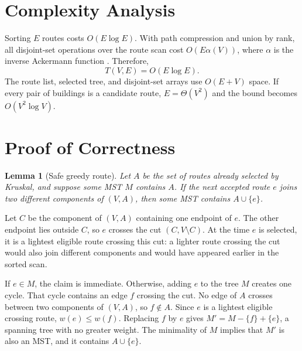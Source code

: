 \documentclass[conference]{IEEEtran}
\newtheorem{lemma}{Lemma}
\begin{document}
\section{Complexity Analysis}

Sorting $E$ routes costs $O(E\log E)$. With path compression and union by
rank, all disjoint-set operations over the route scan cost
$O(E\alpha(V))$, where $\alpha$ is the inverse Ackermann function
\cite{cormen2009introduction}. Therefore,
\begin{equation}
  T(V,E)=O(E\log E).
\end{equation}
The route list, selected tree, and disjoint-set arrays use $O(E+V)$ space. If
every pair of buildings is a candidate route, $E=\Theta(V^2)$ and the bound
becomes $O(V^2\log V)$.

\section{Proof of Correctness}

\begin{lemma}[Safe greedy route]\label{lem:safe}
Let $A$ be the set of routes already selected by Kruskal, and suppose some MST
$M$ contains $A$. If the next accepted route $e$ joins two different
components of $(V,A)$, then some MST contains $A\cup\{e\}$.
\end{lemma}

\begin{IEEEproof}
Let $C$ be the component of $(V,A)$ containing one endpoint of $e$. The
other endpoint lies outside $C$, so $e$ crosses the cut $(C,V\setminus C)$.
At the time $e$ is selected, it is a lightest eligible route crossing this
cut: a lighter route crossing the cut would also join different components and
would have appeared earlier in the sorted scan.

If $e\in M$, the claim is immediate. Otherwise, adding $e$ to the tree $M$
creates one cycle. That cycle contains an edge $f$ crossing the cut. No edge
of $A$ crosses between two components of $(V,A)$, so $f\notin A$. Since
$e$ is a lightest eligible crossing route, $w(e)\le w(f)$. Replacing $f$ by
$e$ gives $M'=M-\{f\}+\{e\}$, a spanning tree with no greater weight. The
minimality of $M$ implies that $M'$ is also an MST, and it contains
$A\cup\{e\}$.
\end{IEEEproof}
\end{document}
